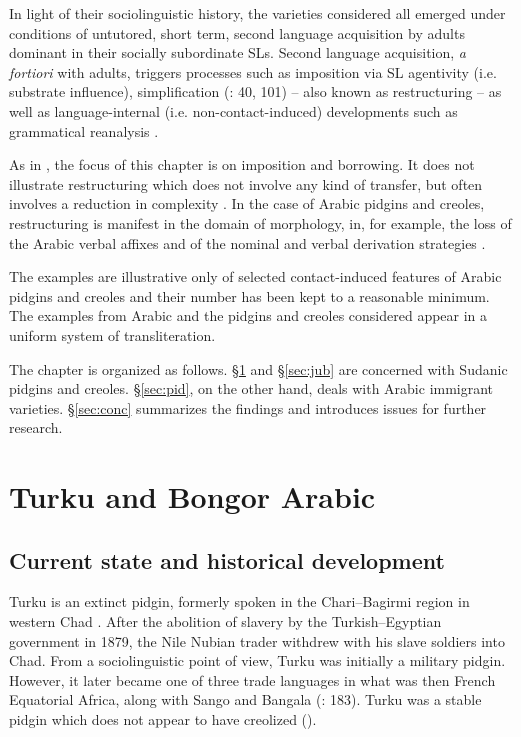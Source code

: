 \documentclass[output=paper]{langsci/langscibook}
\begin{document}
  In light of their sociolinguistic history, the varieties considered all emerged under conditions of untutored, short term, second language acquisition by adults dominant in their socially subordinate SLs. Second language acquisition, \textit{a} \textit{fortiori} with adults, triggers processes such as imposition via SL agentivity (i.e. substrate influence), simplification (\citealt{Trudgill2011}: 40, 101) – also known as restructuring \citep[529]{Lucas2015} – as well as language-internal (i.e. non-contact-induced) developments such as grammatical reanalysis \citep[415]{Winford2005}.

  As in \citet{Manfredi2018}, the focus of this chapter is on imposition and borrowing. It does not illustrate restructuring which does not involve any kind of transfer, but often involves a reduction in complexity \citep[529]{Lucas2015}. In the case of Arabic pidgins and creoles, restructuring is manifest in the domain of morphology, in, for example, the loss of the Arabic verbal affixes and of the nominal and verbal derivation strategies \citep{Miller1993}.

  The examples are illustrative only of selected contact-induced features of Arabic pidgins and creoles and their number has been kept to a reasonable minimum. The examples from Arabic and the pidgins and creoles considered appear in a uniform system of transliteration.

  The chapter is organized as follows. §\ref{sec:tur} and §\ref{sec:jub} are concerned with Sudanic pidgins and creoles. §\ref{sec:pid}, on the other hand, deals with Arabic immigrant varieties. §\ref{sec:conc} summarizes the findings and introduces issues for further research.


 \section{Turku and Bongor Arabic}\label{sec:tur}


 \subsection{Current state and historical development}


Turku is an extinct pidgin, formerly spoken in the Chari--Bagirmi region in western Chad \citep{Muraz1926}. After the abolition of slavery by the Turkish--Egyptian government in 1879, the Nile Nubian trader  withdrew with his slave soldiers into Chad. From a sociolinguistic point of view, Turku was initially a military pidgin. However, it later became one of three trade languages in what was then French Equatorial Africa, along with Sango and Bangala (\citealt{ToscoOwens1993}: 183). Turku was a stable pidgin which does not appear to have creolized (\citealt{ToscoOwens1993}).
\end{document}
